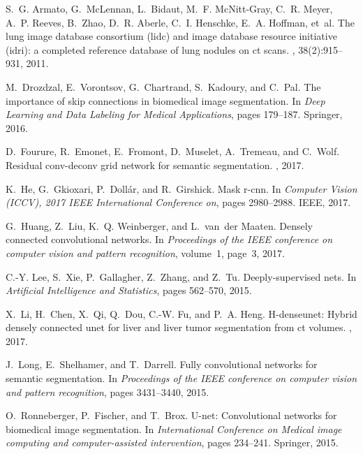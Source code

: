 \documentclass[zihao=-4,a4paper]{ctexart}
\numberwithin{equation}{section}  %
\numberwithin{table}{section}     %
\numberwithin{figure}{section}    %
\begin{document}
\begin{thebibliography}{10}\itemsep=-1pt

S.~G. Armato, G.~McLennan, L.~Bidaut, M.~F. McNitt-Gray, C.~R. Meyer, A.~P.
  Reeves, B.~Zhao, D.~R. Aberle, C.~I. Henschke, E.~A. Hoffman, et~al.
\newblock The lung image database consortium (lidc) and image database resource
  initiative (idri): a completed reference database of lung nodules on ct
  scans.
, 38(2):915--931, 2011.

M.~Drozdzal, E.~Vorontsov, G.~Chartrand, S.~Kadoury, and C.~Pal.
\newblock The importance of skip connections in biomedical image segmentation.
\newblock In {\em Deep Learning and Data Labeling for Medical Applications},
  pages 179--187. Springer, 2016.

D.~Fourure, R.~Emonet, E.~Fromont, D.~Muselet, A.~Tremeau, and C.~Wolf.
\newblock Residual conv-deconv grid network for semantic segmentation.
, 2017.

K.~He, G.~Gkioxari, P.~Doll{\'a}r, and R.~Girshick.
\newblock Mask r-cnn.
\newblock In {\em Computer Vision (ICCV), 2017 IEEE International Conference
  on}, pages 2980--2988. IEEE, 2017.

G.~Huang, Z.~Liu, K.~Q. Weinberger, and L.~van~der Maaten.
\newblock Densely connected convolutional networks.
\newblock In {\em Proceedings of the IEEE conference on computer vision and
  pattern recognition}, volume~1, page~3, 2017.

C.-Y. Lee, S.~Xie, P.~Gallagher, Z.~Zhang, and Z.~Tu.
\newblock Deeply-supervised nets.
\newblock In {\em Artificial Intelligence and Statistics}, pages 562--570,
  2015.

X.~Li, H.~Chen, X.~Qi, Q.~Dou, C.-W. Fu, and P.~A. Heng.
\newblock H-denseunet: Hybrid densely connected unet for liver and liver tumor
  segmentation from ct volumes.
, 2017.

J.~Long, E.~Shelhamer, and T.~Darrell.
\newblock Fully convolutional networks for semantic segmentation.
\newblock In {\em Proceedings of the IEEE conference on computer vision and
  pattern recognition}, pages 3431--3440, 2015.

O.~Ronneberger, P.~Fischer, and T.~Brox.
\newblock U-net: Convolutional networks for biomedical image segmentation.
\newblock In {\em International Conference on Medical image computing and
  computer-assisted intervention}, pages 234--241. Springer, 2015.


\end{thebibliography}
\end{document}
